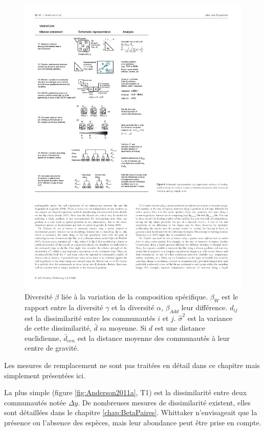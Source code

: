 \documentclass[
  11pt,
  french,
  a4paper,
  extrafontsizes,onecolumn,openright
  ]{memoir}
\begin{document}
\normalsize



\scriptsize

\begin{figure}

{\centering \includegraphics[width=0.8\linewidth]{images/Anderson2011b} 

}

\caption{Diversité \(\beta\) liée à la variation de la composition spécifique. \(\beta_W\) est le rapport entre la diversité \(\gamma\) et la diversité \(\alpha\), \(\beta_{Add}\) leur différence. \(d_{ij}\) est la dissimilarité entre les communautés \(i\) et \(j\). \(\hat{\sigma}^2\) est la variance de cette dissimilarité, \(\bar{d}\) sa moyenne. Si \(d\) est une distance euclidienne, \(\bar{d}_{cen}\) est la distance moyenne des communautés à leur centre de gravité.}\label{fig:Anderson2011b}
\end{figure}

\normalsize

Les mesures de remplacement ne sont pas traitées en détail dans ce chapitre mais simplement présentées ici.

La plus simple (figure \ref{fig:Anderson2011a}, T1) est la dissimilarité entre deux communautés notée \(\Delta{y}\).
De nombreuses mesures de dissimilarité existent, elles sont détaillées dans le chapitre \ref{chap:BetaPaires}.
Whittaker n'envisageait que la présence ou l'absence des espèces, mais leur abondance peut être prise en compte.
\end{document}
